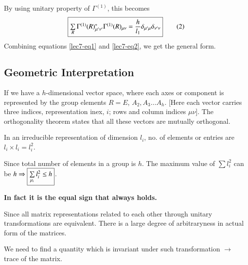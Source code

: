 \chapter[Lecture 7]{}\label{lec7}

By using unitary property of $\Gamma^{(1)}$, this becomes
\begin{equation*}
\fbox{$\sum\limits_{R}\Gamma^{(1)}(R)^{*}_{\mu'\nu'}\Gamma^{(1)}(R)_{\mu\nu}=\dfrac{h}{l_{1}}\delta_{\mu'\mu}\delta_{\nu'\nu}$}\tag{2}\label{lec7-eq2}
\end{equation*}
Combining equations \eqref{lec7-eq1} and \eqref{lec7-eq2}, we get the general form.

\section*{Geometric Interpretation}

If we have a $h$-dimensional vector space, where each axes or component is represented by the group elements $R=E$, $A_{2},A_{3}\ldots A_{h}$. [Here each vector carries three indices, representation inex, $i$; rows and column indices $\mu\nu$]. The orthogonality theorem states that all these vectors are mutually orthogonal.

In an irreducible representation of dimension $l_{i}$, no. of elements or entries are $l_{i}\times l_{i}=l_{i}^{2}$.

Since total number of elements in a group is $h$. The maximum value of $\sum l^{2}_{i}$ can be $h \Rightarrow \fbox{$\sum\limits_{\mu_{i}}l^{2}_{i}\leq h$}$.

{\bf In fact it is the equal sign that always holds.}

Since all matrix representations related to each other through unitary transformations are equivalent. There is a large degree of arbitraryness in actual form of the matrices.

We need to find a quantity which is invariant under such transformation $\to$ trace of the matrix.

